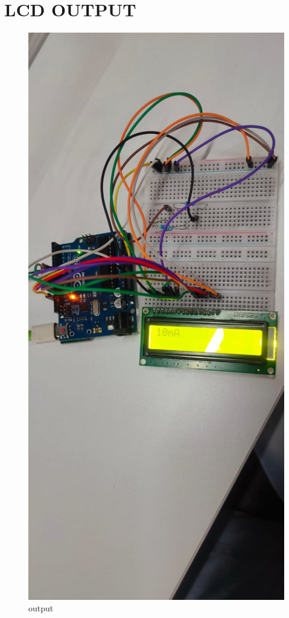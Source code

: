 \documentclass[journal,12pt,twocolumn]{IEEEtran}
\begin{document}
    \section{\textbf{LCD OUTPUT}}
 \begin{figure}[H]
\centering
\includegraphics[width=\columnwidth]{output.jpg}
\caption{output}
\label{fig:lcd}
\end{figure}


 
\end{document}
